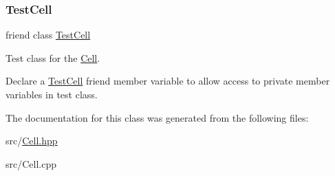 \subsubsection{\texorpdfstring{Test\+Cell}{TestCell}}
{\footnotesize\ttfamily friend class \hyperlink{class_test_cell}{Test\+Cell}\hspace{0.3cm}{\ttfamily [friend]}}



Test class for the \hyperlink{class_cell}{Cell}. 

Declare a \hyperlink{class_test_cell}{Test\+Cell} friend member variable to allow access to private member variables in test class. 

The documentation for this class was generated from the following files\+:\begin{DoxyCompactItemize}
\item 
src/\hyperlink{_cell_8hpp}{Cell.\+hpp}\item 
src/Cell.\+cpp\end{DoxyCompactItemize}
